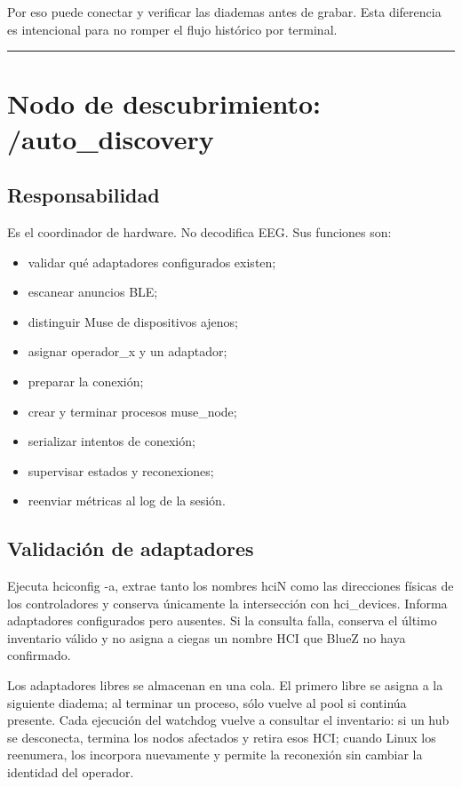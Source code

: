 \documentclass[11pt,a4paper]{article}
\begin{document}
Por eso puede conectar y verificar las diademas antes de grabar. Esta diferencia es intencional para no romper el flujo histórico por terminal.

\medskip\hrule\medskip

\section{Nodo de descubrimiento: {\ttfamily\small /auto\_discovery}}

\subsection{Responsabilidad}

Es el coordinador de hardware. No decodifica EEG. Sus funciones son:

\begin{itemize}
\item validar qué adaptadores configurados existen;
\item escanear anuncios BLE;
\item distinguir Muse de dispositivos ajenos;
\item asignar {\ttfamily\small operador\_x} y un adaptador;
\item preparar la conexión;
\item crear y terminar procesos {\ttfamily\small muse\_node};
\item serializar intentos de conexión;
\item supervisar estados y reconexiones;
\item reenviar métricas al log de la sesión.
\end{itemize}

\subsection{Validación de adaptadores}

Ejecuta {\ttfamily\small hciconfig -a}, extrae tanto los nombres
{\ttfamily\small hciN} como las direcciones físicas de los controladores y conserva
únicamente la intersección con {\ttfamily\small hci\_devices}. Informa adaptadores
configurados pero ausentes. Si la consulta falla, conserva el último inventario válido y
no asigna a ciegas un nombre HCI que BlueZ no haya confirmado.

Los adaptadores libres se almacenan en una cola. El primero libre se asigna a la siguiente
diadema; al terminar un proceso, sólo vuelve al pool si continúa presente. Cada ejecución
del watchdog vuelve a consultar el inventario: si un hub se desconecta, termina los nodos
afectados y retira esos HCI; cuando Linux los reenumera, los incorpora nuevamente y permite
la reconexión sin cambiar la identidad del operador.
\end{document}
